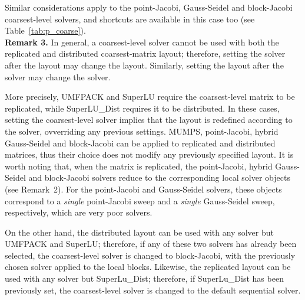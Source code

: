 Similar considerations apply to the point-Jacobi, Gauss-Seidel and block-Jacobi
coarsest-level solvers, and shortcuts are available
in this case too (see Table~\ref{tab:p_coarse}). \\

\textbf{Remark 3.} In general, a coarsest-level solver cannot be used with
both the replicated and distributed coarsest-matrix layout;
therefore, setting the solver after the layout may change the layout.
Similarly, setting the layout after the solver may change the solver.

More precisely, UMFPACK and SuperLU require the coarsest-level
matrix to be replicated, while SuperLU\_Dist requires it to be distributed.
In these cases, setting the coarsest-level solver implies that
the layout is redefined according to the solver, ovverriding any
previous settings. MUMPS,  point-Jacobi,
hybrid Gauss-Seidel and block-Jacobi can be applied to
replicated and distributed matrices, thus their choice
does not modify any previously specified layout.
It is worth noting that, when the matrix is replicated,
the point-Jacobi, hybrid Gauss-Seidel and block-Jacobi solvers
reduce to the corresponding local solver objects (see Remark~2).
For the point-Jacobi and Gauss-Seidel solvers, these objects
correspond to a \emph{single} point-Jacobi sweep and a \emph{single} 
Gauss-Seidel sweep, respectively, which are very poor solvers.

On the other hand, the distributed layout can be used with any solver
but UMFPACK and SuperLU; therefore, if any of these two solvers has already
been selected, the coarsest-level solver is changed to block-Jacobi,
with the previously chosen solver applied to the local blocks.
Likewise, the replicated layout can be used with any solver but SuperLu\_Dist;
therefore, if SuperLu\_Dist has been previously set, the coarsest-level
solver is changed to the default sequential solver.



